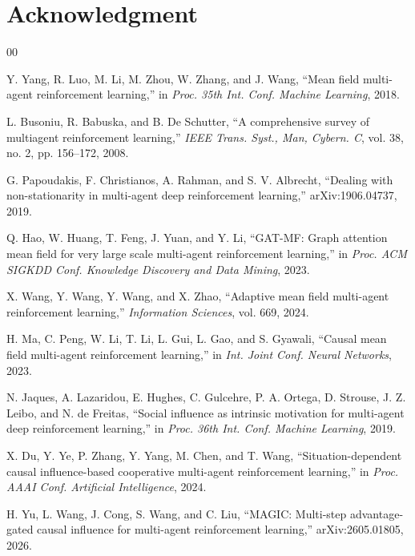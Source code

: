 \documentclass[conference]{IEEEtran}
\begin{document}
\section*{Acknowledgment}

\begin{thebibliography}{00}

 Y. Yang, R. Luo, M. Li, M. Zhou, W. Zhang, and J. Wang, ``Mean field multi-agent reinforcement learning,'' in \textit{Proc. 35th Int. Conf. Machine Learning}, 2018.

 L. Busoniu, R. Babuska, and B. De Schutter, ``A comprehensive survey of multiagent reinforcement learning,'' \textit{IEEE Trans. Syst., Man, Cybern. C}, vol. 38, no. 2, pp. 156--172, 2008.

 G. Papoudakis, F. Christianos, A. Rahman, and S. V. Albrecht, ``Dealing with non-stationarity in multi-agent deep reinforcement learning,'' arXiv:1906.04737, 2019.

 Q. Hao, W. Huang, T. Feng, J. Yuan, and Y. Li, ``GAT-MF: Graph attention mean field for very large scale multi-agent reinforcement learning,'' in \textit{Proc. ACM SIGKDD Conf. Knowledge Discovery and Data Mining}, 2023.

 X. Wang, Y. Wang, Y. Wang, and X. Zhao, ``Adaptive mean field multi-agent reinforcement learning,'' \textit{Information Sciences}, vol. 669, 2024.

 H. Ma, C. Peng, W. Li, T. Li, L. Gui, L. Gao, and S. Gyawali, ``Causal mean field multi-agent reinforcement learning,'' in \textit{Int. Joint Conf. Neural Networks}, 2023.

 N. Jaques, A. Lazaridou, E. Hughes, C. Gulcehre, P. A. Ortega, D. Strouse, J. Z. Leibo, and N. de Freitas, ``Social influence as intrinsic motivation for multi-agent deep reinforcement learning,'' in \textit{Proc. 36th Int. Conf. Machine Learning}, 2019.

 X. Du, Y. Ye, P. Zhang, Y. Yang, M. Chen, and T. Wang, ``Situation-dependent causal influence-based cooperative multi-agent reinforcement learning,'' in \textit{Proc. AAAI Conf. Artificial Intelligence}, 2024.

 H. Yu, L. Wang, J. Cong, S. Wang, and C. Liu, ``MAGIC: Multi-step advantage-gated causal influence for multi-agent reinforcement learning,'' arXiv:2605.01805, 2026.


\end{thebibliography}
\end{document}
